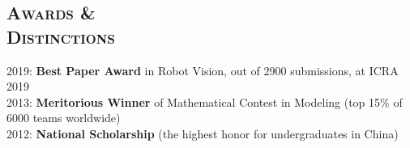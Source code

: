 \documentclass[margin, line, 10pt]{res} %
\begin{document}
\begin{resume}



\section{\textsc{Awards \&\\Distinctions}}
2019: {\bf Best Paper Award} in Robot Vision, out of 2900 submissions, at ICRA 2019\\
2013: {\bf Meritorious Winner} of Mathematical Contest in Modeling (top 15\% of 6000 teams worldwide)\\
2012: {\bf National Scholarship} (the highest honor for undergraduates in China)


\end{resume}
\end{document}
